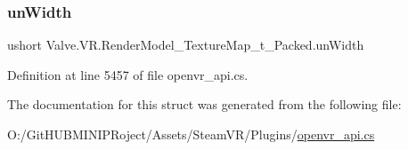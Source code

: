 \subsubsection{\texorpdfstring{unWidth}{unWidth}}
{\footnotesize\ttfamily ushort Valve.\+V\+R.\+Render\+Model\+\_\+\+Texture\+Map\+\_\+t\+\_\+\+Packed.\+un\+Width}



Definition at line 5457 of file openvr\+\_\+api.\+cs.



The documentation for this struct was generated from the following file\+:\begin{DoxyCompactItemize}
\item 
O\+:/\+Git\+H\+U\+B\+M\+I\+N\+I\+P\+Roject/\+Assets/\+Steam\+V\+R/\+Plugins/\mbox{\hyperlink{openvr__api_8cs}{openvr\+\_\+api.\+cs}}\end{DoxyCompactItemize}
